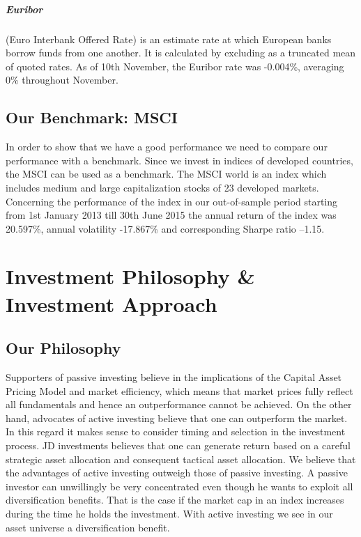 \documentclass[11pt, parskip=full, DIV=14]{scrreprt}
\begin{document}
\paragraph{Euribor} (Euro Interbank Offered Rate) is an estimate rate at which European banks borrow funds from one another.
It is calculated by excluding as a truncated mean of quoted rates.
As of 10th November, the Euribor rate was -0.004\%, averaging 0\% throughout November.


\section*{Our Benchmark: MSCI}
In order to show that we have a good performance we need to compare our performance with a benchmark.
Since we invest in indices of developed countries, the MSCI can be used as a benchmark.
The MSCI world is an index  which includes medium and large capitalization stocks of 23 developed markets.
Concerning the performance of the index in our out-of-sample period starting from 1st January 2013 till 30th June 2015 the annual return of the index was 20.597\%, annual volatility -17.867\% and corresponding Sharpe ratio –1.15.

\chapter{Investment Philosophy \& Investment Approach}
\section*{Our Philosophy}
Supporters of passive investing believe in the implications of the Capital Asset Pricing Model and market efficiency, which means that market prices fully reflect all fundamentals and hence an outperformance cannot be achieved.
On the other hand, advocates of active investing believe that one can outperform the market.
In this regard it makes sense to consider timing and selection in the investment process.
JD investments believes that one can generate return based on a careful strategic asset allocation and consequent tactical asset allocation.
We believe that the advantages of active investing outweigh those of passive investing.
A passive investor can unwillingly be very concentrated even though he wants to exploit all diversification benefits.
That is the case if the market cap in an index increases during the time he holds the investment.
With active investing we see in our asset universe a diversification benefit.
\end{document}
